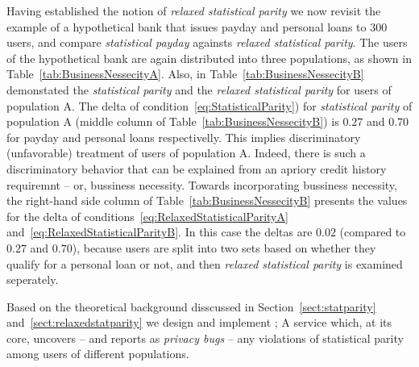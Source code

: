 Having established the notion of {\em relaxed statistical parity} we now revisit
the example of a hypothetical bank that issues payday and personal loans to 300
users, and compare {\em statistical payday} againsts {\em relaxed statistical
parity}. The users of the hypothetical bank are again distributed into three
populations, as shown in Table~\ref{tab:BusinessNessecityA}. Also, in
Table~\ref{tab:BusinessNessecityB} demonstated the {\em statistical parity}
and the {\em relaxed statistical parity} for users of population A. The delta
of condition~\ref{eq:StatisticalParity}) for {\em statistical parity} of
population A (middle column of Table~\ref{tab:BusinessNessecityB}) is $0.27$
and $0.70$ for payday and personal loans respectivelly. This implies
discriminatory (unfavorable) treatment of users of population A. Indeed, there
is such a discriminatory behavior that can be explained from an apriory
credit history requiremnt -- or, bussiness necessity. Towards incorporating
bussiness necessity, the right-hand side column of
Table~\ref{tab:BusinessNessecityB} presents the values for the delta of
conditions~\ref{eq:RelaxedStatisticalParityA}
and~\ref{eq:RelaxedStatisticalParityB}. In this case the deltas are $0.02$
(compared to $0.27$ and $0.70$), because users are split into two sets
based on whether they qualify for a personal loan or not, and then
{\em relaxed statistical parity} is examined seperately.

Based on the theoretical background disscussed in Section~\ref{sect:statparity}
and~\ref{sect:relaxedstatparity} we design and implement \sysname; A service
which, at its core, uncovers -- and reports as {\em privacy bugs} -- any violations
of statistical parity among users of different populations.


